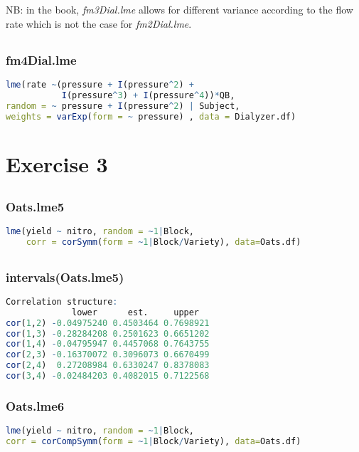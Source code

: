 \documentclass[a4paper,12pt]{article}
\begin{document}
	NB: in the book, \textit{fm3Dial.lme} allows for different variance according to the flow rate which is not the case for \textit{fm2Dial.lme}.
	
	\subsection{}
	\subsubsection*{fm4Dial.lme}
	\begin{lstlisting}[language=R]
lme(rate ~(pressure + I(pressure^2) +
           I(pressure^3) + I(pressure^4))*QB,
random = ~ pressure + I(pressure^2) | Subject,
weights = varExp(form = ~ pressure) , data = Dialyzer.df)
	\end{lstlisting}

	\section{Exercise 3}
	\subsection{}
	\subsubsection*{Oats.lme5}
	\begin{lstlisting}[language=R]
lme(yield ~ nitro, random = ~1|Block,
    corr = corSymm(form = ~1|Block/Variety), data=Oats.df)
	\end{lstlisting}
	
	\newpage
	\subsection{}
	\subsubsection*{intervals(Oats.lme5)}
	\begin{lstlisting}[language=R]
Correlation structure:
             lower      est.     upper
cor(1,2) -0.04975240 0.4503464 0.7698921
cor(1,3) -0.28284208 0.2501623 0.6651202
cor(1,4) -0.04795947 0.4457068 0.7643755
cor(2,3) -0.16370072 0.3096073 0.6670499
cor(2,4)  0.27208984 0.6330247 0.8378083
cor(3,4) -0.02484203 0.4082015 0.7122568
	\end{lstlisting}
	
	\subsubsection*{Oats.lme6}
	\begin{lstlisting}[language=R]
lme(yield ~ nitro, random = ~1|Block,
corr = corCompSymm(form = ~1|Block/Variety), data=Oats.df)
	\end{lstlisting}
	
\end{document}
